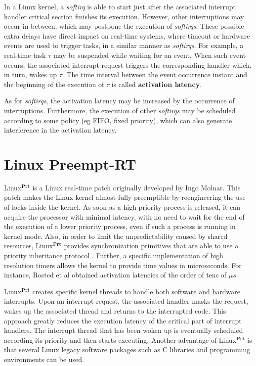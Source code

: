 \documentclass{acm_proc_article-sp}
\begin{document}
In a Linux kernel, a \emph{softirq} is able to start just after the associated
interrupt handler critical section finishes its execution. However, other
interruptions may occur in between, which may postpone the execution of
\emph{softirqs}. These possible extra delays have direct impact on real-time
systems, where timeout or hardware events are used to trigger tasks, in a similar
manner as \emph{softirqs}. For example, a real-time task $\tau$ may be suspended
while waiting for an event. When such event occurs, the associated interrupt
request triggers the corresponding handler which, in turn, wakes up $\tau$. The time
interval between the event occurrence instant and the beginning of the execution of
$\tau$ is called \textbf{activation latency}.

As for \emph{softirqs}, the activation latency may be increased by the occurrence of
interruptions. Furthermore, the execution of other \emph{softirqs} may be scheduled
according to some policy (eg FIFO, fixed priority), which can also generate
interference in the activation latency. 

\section{Linux Preempt-RT}
\label{sec:preemptRT}

Linux$^{\mathbf{Prt}}$ \cite{McKenney05, Rostedt07} is a Linux real-time patch
originally developed by Ingo Molnar.  This patch makes the Linux kernel almost fully
preemptible by reengineering the use of locks inside the kernel.  As soon as a high
priority process is released, it can acquire the processor with minimal latency,
with no need to wait for the end of the execution of a lower priority process, even
if such a process is running in kernel mode. Also, in order to limit the
unpredictability caused by shared resources, Linux$^{\mathbf{Prt}}$ provides
synchronization primitives that are able to use a priority inheritance protocol
\cite{Sha90}. Further, a specific implementation of high resolution timers
\cite{Kernel} allows the kernel to provide time values in microseconds. For
instance, Rosted et al \cite{Rostedt07, Siro07} obtained activation latencies of the
order of tens of $\mu s$.

Linux$^{\mathbf{Prt}}$ creates specific kernel threads to handle both software and
hardware interrupts.  Upon an interrupt request, the associated handler masks the
request, wakes up the associated thread and returns to the interrupted code. This
approach greatly reduces the execution latency of the critical part of interrupt
handlers. The interrupt thread that has been woken up is eventually scheduled
according its priority and then starts executing.  Another advantage of
Linux$^{\mathbf{Prt}}$ is that several Linux legacy software packages such as C
libraries and programming environments can be used.
\end{document}
